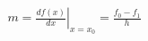 \documentclass[preview]{standalone}
\begin{document}
\begin{align*}
m =\left.\frac{df(x)}{dx}\right|_{x=x_{0}} =\frac{f_{0} - f_{1}}{h}
\end{align*}
\end{document}

